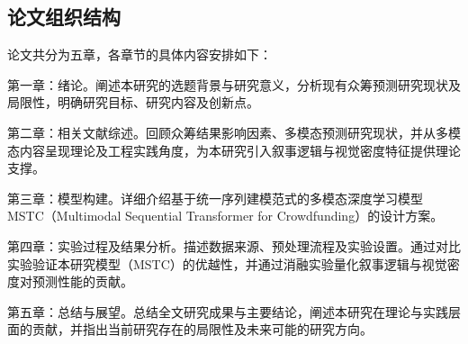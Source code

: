 \subsection{论文组织结构}
论文共分为五章，各章节的具体内容安排如下：

第一章：绪论。阐述本研究的选题背景与研究意义，分析现有众筹预测研究现状及局限性，明确研究目标、研究内容及创新点。

第二章：相关文献综述。回顾众筹结果影响因素、多模态预测研究现状，并从多模态内容呈现理论及工程实践角度，为本研究引入叙事逻辑与视觉密度特征提供理论支撑。

第三章：模型构建。详细介绍基于统一序列建模范式的多模态深度学习模型 MSTC（Multimodal Sequential Transformer for Crowdfunding）的设计方案。

第四章：实验过程及结果分析。描述数据来源、预处理流程及实验设置。通过对比实验验证本研究模型（MSTC）的优越性，并通过消融实验量化叙事逻辑与视觉密度对预测性能的贡献。

第五章：总结与展望。总结全文研究成果与主要结论，阐述本研究在理论与实践层面的贡献，并指出当前研究存在的局限性及未来可能的研究方向。
